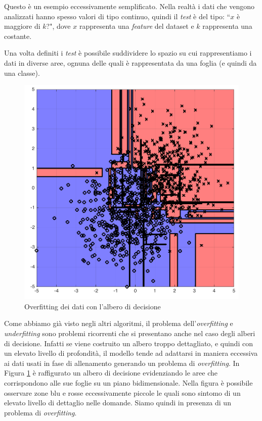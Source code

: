 \documentclass[12pt,italian]{report}
\begin{document}
Questo è un esempio eccessivamente semplificato. Nella realtà i dati che vengono analizzati hanno spesso valori di tipo continuo, quindi il \emph{test} è del tipo: ``$ x $ è maggiore di $ k $?", dove $x$  rappresenta una \emph{feature} del dataset e $k$ rappresenta una costante.

Una volta definiti i \emph{test} è possibile suddividere lo spazio su cui rappresentiamo i dati in diverse aree, ognuna delle quali è rappresentata da una foglia (e quindi da una classe).


\begin{figure}[h!]
	\center
	\includegraphics[scale=0.2]{../img/overfit_decision_trees1} %
	\caption{Overfitting dei dati con l'albero di decisione}
	\label{fig:overfit_decision_trees1}
\end{figure}

Come abbiamo già visto negli altri algoritmi, il problema dell'\emph{overfitting} e \emph{underfitting} sono problemi ricorrenti che si presentano anche nel caso degli alberi di decisione.
Infatti se viene costruito un albero troppo dettagliato, e quindi con un elevato livello di profondità, il modello tende ad adattarsi in maniera eccessiva ai dati usati in fase di allenamento generando un problema di \emph{overfitting}. In Figura \ref{fig:overfit_decision_trees1} è raffigurato un albero di decisione evidenziando le aree che corrispondono alle sue foglie su un piano bidimensionale. Nella figura è possibile osservare zone blu e rosse eccessivamente piccole le quali sono sintomo di un elevato livello di dettaglio nelle domande. Siamo quindi in presenza di un problema di \emph{overfitting}.
\end{document}
